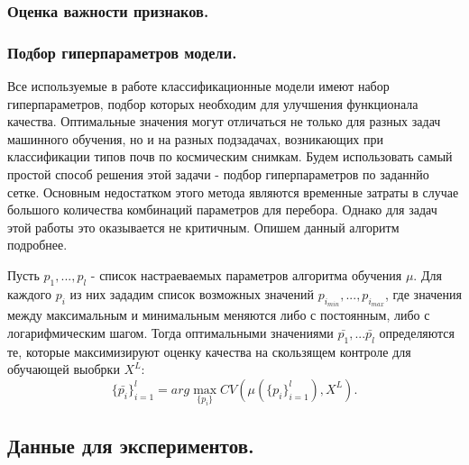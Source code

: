 \documentclass[12pt]{article}
\begin{document}
\subsubsection{Оценка важности признаков.}


\subsubsection{Подбор гиперпараметров модели.}

\par
Все используемые в работе классификационные модели имеют набор гиперпараметров, подбор которых
необходим для улучшения функционала качества. Оптимальные значения могут отличаться не только
для разных задач машинного обучения, но и на разных подзадачах, возникающих при классификации
типов почв по космическим снимкам. Будем использовать самый простой способ решения этой задачи - 
подбор гиперпараметров по заданнйо сетке. Основным недостатком этого метода являются
временные затраты в случае большого количества комбинаций параметров для перебора.
Однако для задач этой работы это оказывается не критичным. Опишем данный алгоритм подробнее.
\par
Пусть $p_1, ..., p_l$ - список настраеваемых параметров алгоритма обучения $\mu$.
Для каждого $p_i$ из них зададим список возможных значений $p_{i_{min}}, ..., p_{i_{max}}$,
где значения между максимальным и минимальным меняются либо с постоянным,
либо с логарифмическим шагом. Тогда оптимальными значениями $\bar{p_1}, ... \bar{p_l}$
определяются те, которые максимизируют оценку качества на скользящем контроле для
обучающей выобрки $X^L$:
\[
    \{\bar{p_i}\}_{i=1}^l=arg\max_{\{p_i\}} CV(\mu(\{p_i\}_{i=1}^l), X^L).
\]

\subsection{Данные для экспериментов.}
\end{document}
